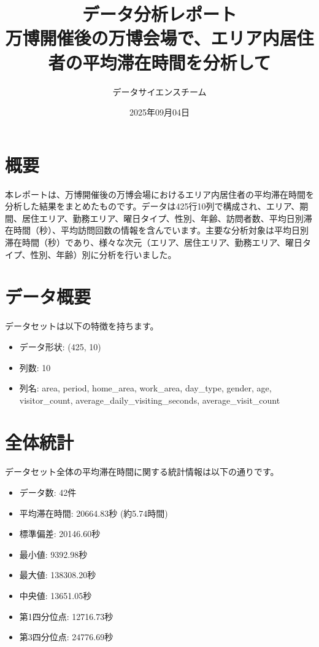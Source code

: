 \documentclass[11pt,a4paper]{article}
\title{\textbf{データ分析レポート} \\ 万博開催後の万博会場で、エリア内居住者の平均滞在時間を分析して}
\author{データサイエンスチーム}
\date{2025年09月04日}
\begin{document}
\maketitle
\tableofcontents
\newpage

\section{概要}

本レポートは、万博開催後の万博会場におけるエリア内居住者の平均滞在時間を分析した結果をまとめたものです。データは425行10列で構成され、エリア、期間、居住エリア、勤務エリア、曜日タイプ、性別、年齢、訪問者数、平均日別滞在時間（秒）、平均訪問回数の情報を含んでいます。主要な分析対象は平均日別滞在時間（秒）であり、様々な次元（エリア、居住エリア、勤務エリア、曜日タイプ、性別、年齢）別に分析を行いました。

\section{データ概要}

データセットは以下の特徴を持ちます。

\begin{itemize}
    \item データ形状: (425, 10)
    \item 列数: 10
    \item 列名: area, period, home\_area, work\_area, day\_type, gender, age, visitor\_count, average\_daily\_visiting\_seconds, average\_visit\_count
\end{itemize}

\section{全体統計}

データセット全体の平均滞在時間に関する統計情報は以下の通りです。

\begin{itemize}
    \item データ数: 42件
    \item 平均滞在時間: 20664.83秒 (約5.74時間)
    \item 標準偏差: 20146.60秒
    \item 最小値: 9392.98秒
    \item 最大値: 138308.20秒
    \item 中央値: 13651.05秒
    \item 第1四分位点: 12716.73秒
    \item 第3四分位点: 24776.69秒
\end{itemize}
\end{document}
